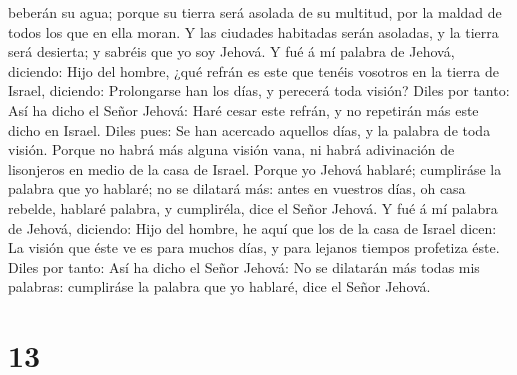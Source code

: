 beberán su agua; porque su tierra será asolada de su multitud, por la
maldad de todos los que en ella moran.  Y las ciudades
habitadas serán asoladas, y la tierra será desierta; y sabréis que yo
soy Jehová.  Y fué á mí palabra de Jehová, diciendo:
 Hijo del hombre, ¿qué refrán es este que tenéis vosotros
en la tierra de Israel, diciendo: Prolongarse han los días, y perecerá
toda visión?  Diles por tanto: Así ha dicho el Señor
Jehová: Haré cesar este refrán, y no repetirán más este dicho en Israel.
Diles pues: Se han acercado aquellos días, y la palabra de toda visión.
 Porque no habrá más alguna visión vana, ni habrá
adivinación de lisonjeros en medio de la casa de Israel. 
Porque yo Jehová hablaré; cumpliráse la palabra que yo hablaré; no se
dilatará más: antes en vuestros días, oh casa rebelde, hablaré palabra,
y cumpliréla, dice el Señor Jehová.  Y fué á mí palabra de
Jehová, diciendo:  Hijo del hombre, he aquí que los de la
casa de Israel dicen: La visión que éste ve es para muchos días, y para
lejanos tiempos profetiza éste.  Diles por tanto: Así ha
dicho el Señor Jehová: No se dilatarán más todas mis palabras:
cumpliráse la palabra que yo hablaré, dice el Señor Jehová.

\hypertarget{section-12}{%
\section{13}\label{section-12}}

